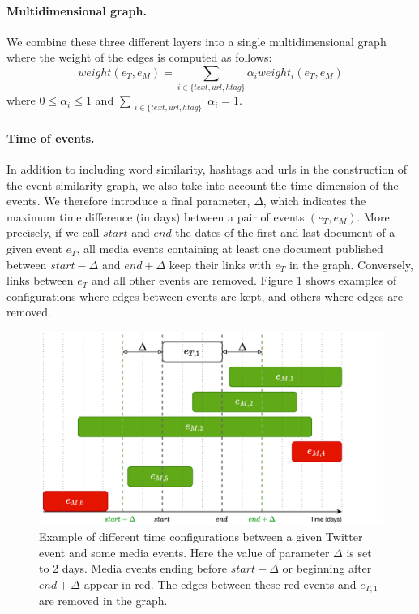 \paragraph{Multidimensional graph.} We combine these three different layers into a single multidimensional graph where the weight of the edges is computed as follows:
\begin{equation}
    weight(e_T, e_M) = \sum_{i \in \{text, url, htag\}} \alpha_i weight_i(e_T, e_M)
\end{equation}
where $0 \leq \alpha_i \leq 1$ and $\sum\limits_{\substack{i \in \{text, url, htag\}}}{\alpha_i = 1}$.

\paragraph{Time of events.} In addition to including word similarity, hashtags and urls in the construction of the event similarity graph, we also take into account the time dimension of the events. We therefore introduce a final parameter, $\Delta$, which indicates the maximum time difference (in days) between a pair of events $(e_T, e_M)$. More precisely, if we call $start$ and $end$ the dates of the first and last document of a given event $e_T$, all media events containing at least one document published between $start - \Delta$ and $end + \Delta$ keep their links with $e_T$ in the graph. Conversely, links between $e_T$ and all other events are removed. Figure \ref{fig:event_time} shows examples of configurations where edges between events are kept, and others where edges are removed.
 \begin{figure}
 \begin{center}
      \includegraphics[]{figures/event_time.pdf}
    \caption[Example of different time configurations between a given Twitter event and some media events]{Example of different time configurations between a given Twitter event and some media events. Here the value of parameter $\Delta$ is set to 2 days. Media events ending before $start - \Delta$ or beginning after $end + \Delta$ appear in red. The edges between these red events and $e_{T,1}$ are removed in the graph.}
    \label{fig:event_time}
 \end{center}
\end{figure}

